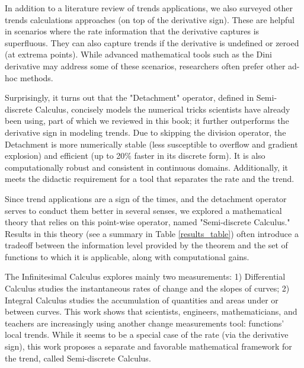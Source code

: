 \documentclass[11pt]{book}
\begin{document}
In addition to a literature review of trends applications, we also surveyed other trends calculations approaches (on top of the derivative sign). These are helpful in scenarios where the rate information that the derivative captures is superfluous. They can also capture trends if the derivative is undefined or zeroed (at extrema points). While advanced mathematical tools such as the Dini derivative may address some of these scenarios, researchers often prefer other ad-hoc methods.

Surprisingly, it turns out that the "Detachment" operator, defined in Semi-discrete Calculus, concisely models the numerical tricks scientists have already been using, part of which we reviewed in this book; it further outperforms the derivative sign in modeling trends. Due to skipping the division operator, the Detachment is more numerically stable (less susceptible to overflow and gradient explosion) and efficient (up to 20\% faster in its discrete form). It is also computationally robust and consistent in continuous domains. Additionally, it meets the didactic requirement for a tool that separates the rate and the trend.

Since trend applications are a sign of the times, and the detachment operator serves to conduct them better in several senses, we explored a mathematical theory that relies on this point-wise operator, named "Semi-discrete Calculus." Results in this theory (see a summary in Table \ref{results_table}) often introduce a tradeoff between the information level provided by the theorem and the set of functions to which it is applicable, along with computational gains.

The Infinitesimal Calculus explores mainly two measurements: 1) Differential Calculus studies the instantaneous rates of change and the slopes of curves; 2) Integral Calculus studies the accumulation of quantities and areas under or between curves. This work shows that scientists, engineers, mathematicians, and teachers are increasingly using another change measurements tool: functions' local trends. While it seems to be a special case of the rate (via the derivative sign), this work proposes a separate and favorable mathematical framework for the trend, called Semi-discrete Calculus.
\end{document}
